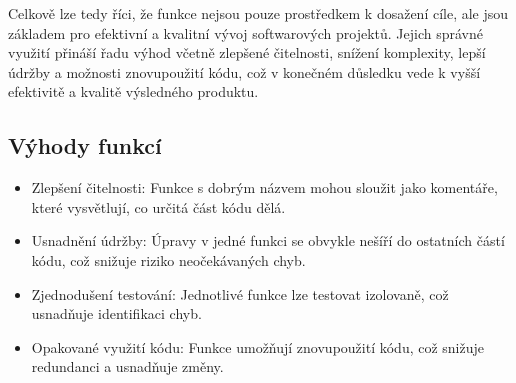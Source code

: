 \documentclass{article}
\begin{document}
\begin{Čistý kód - Funkce}
        Celkově lze tedy říci, že funkce nejsou pouze prostředkem k dosažení cíle, ale jsou základem pro efektivní a kvalitní vývoj softwarových projektů.
        Jejich správné využití přináší řadu výhod včetně zlepšené čitelnosti, snížení komplexity, lepší údržby a možnosti znovupoužití kódu, což v konečném důsledku vede k vyšší efektivitě a kvalitě výsledného produktu.


        \subsection{Výhody funkcí}\label{subsec:vyhody-funkci}
        \begin{itemize}
            \item Zlepšení čitelnosti: Funkce s dobrým názvem mohou sloužit jako komentáře, které vysvětlují, co určitá část kódu dělá.
            \item Usnadnění údržby: Úpravy v jedné funkci se obvykle nešíří do ostatních částí kódu, což snižuje riziko neočekávaných chyb.
            \item Zjednodušení testování: Jednotlivé funkce lze testovat izolovaně, což usnadňuje identifikaci chyb.
            \item Opakované využití kódu: Funkce umožňují znovupoužití kódu, což snižuje redundanci a usnadňuje změny.
        \end{itemize}


\end{Čistý kód - Funkce}
\end{document}
